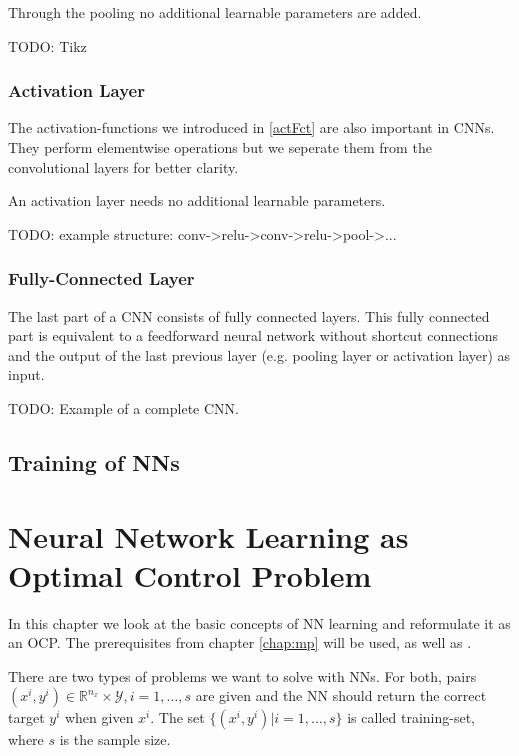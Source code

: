 \documentclass[a4paper, 12pt]{scrreprt} %
\begin{document}
Through the pooling no additional learnable parameters are added.

TODO:
Tikz

\subsection{Activation Layer}
\label{subsec:AL}
The activation-functions we introduced in \ref{actFct} are also important in \acp{CNN}. They perform elementwise operations but we seperate them from the convolutional layers for better clarity.

An activation layer needs no additional learnable parameters.

TODO:
example structure: conv->relu->conv->relu->pool->...

\subsection{Fully-Connected Layer}
\label{subsec:FCL}
The last part of a \ac{CNN} consists of fully connected layers. This fully connected part is equivalent to a feedforward neural network without shortcut connections and the output of the last previous layer (e.g. pooling layer or activation layer) as input. 

TODO:
Example of a complete \ac{CNN}.

\section{Training of \aclp{NN}}


\chapter{Neural Network Learning as Optimal Control Problem}
\label{chap:NNLaOCP}
In this chapter we look at the basic concepts of \ac{NN} learning and reformulate it as an \ac{OCP}. The prerequisites from chapter \ref{chap:mp} will be used, as well as \cite{mlcba}. \newline

There are two types of problems we want to solve with \acp{NN}. For both, pairs $(x^i,y^i) \in \mathbb R^{n_x} \times \mathcal{Y}, i = 1,\dots,s$ are given and the \ac{NN} should return the correct target $y^i$ when given $x^i$. The set $\{(x^i,y^i)\vert i=1,\dots,s\}$ is called training-set, where $s$ is the sample size. 
\end{document}

